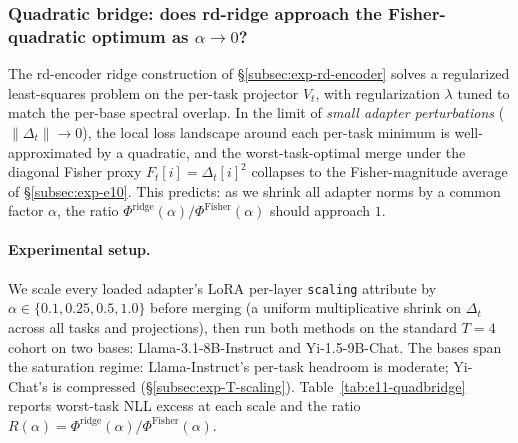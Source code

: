 \subsubsection{Quadratic bridge: does rd-ridge approach the
Fisher-quadratic optimum as $\alpha \to 0$?}
\label{subsec:exp-e11}

The rd-encoder ridge construction of \S\ref{subsec:exp-rd-encoder}
solves a regularized least-squares problem on the per-task projector
$V_t$, with regularization $\lambda$ tuned to match the per-base
spectral overlap. In the limit of \emph{small adapter perturbations}
($\|\Delta_t\| \to 0$), the local loss landscape around each
per-task minimum is well-approximated by a quadratic, and the
worst-task-optimal merge under the diagonal Fisher proxy
$F_t[i] = \Delta_t[i]^2$ collapses to the Fisher-magnitude average
of \S\ref{subsec:exp-e10}. This predicts: as we shrink all adapter
norms by a common factor $\alpha$, the ratio
$\Phi^{\mathrm{ridge}}(\alpha) / \Phi^{\mathrm{Fisher}}(\alpha)$
should approach $1$.

\paragraph{Experimental setup.} We scale every loaded adapter's LoRA
per-layer \verb|scaling| attribute by $\alpha \in
\{0.1, 0.25, 0.5, 1.0\}$ before merging (a uniform multiplicative
shrink on $\Delta_t$ across all tasks and projections), then run
both methods on the standard $T = 4$ cohort on two bases:
Llama-3.1-8B-Instruct and Yi-1.5-9B-Chat. The bases span the
saturation regime: Llama-Instruct's per-task headroom is moderate;
Yi-Chat's is compressed (\S\ref{subsec:exp-T-scaling}).
Table~\ref{tab:e11-quadbridge} reports worst-task NLL excess at
each scale and the ratio $R(\alpha) = \Phi^{\mathrm{ridge}}(\alpha)
/ \Phi^{\mathrm{Fisher}}(\alpha)$.

